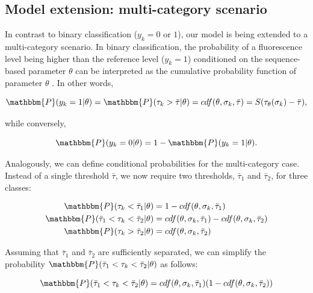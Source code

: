 \documentclass{article}
\begin{document}
\subsection{Model extension: multi-category scenario}

In contrast to binary classification ($y_k=0$ or $1$), our model is being extended to a multi-category scenario. In binary classification, the probability of a fluorescence level being higher than the reference level ($y_k=1$) conditioned on the sequence-based parameter $\theta$ can be interpreted as the cumulative probability function of parameter $\theta$ \cite{Mitra2018NatCommun}. In other words,

\begin{equation}
\mathbbm{P}(y_k=1|\theta) = \mathbbm{P}(\tau_k>\bar{\tau}|\theta) = cdf(\theta,\sigma_k,\bar{\tau})=S(\tau_\theta(\sigma_k)-\bar{\tau}),
\end{equation}

\noindent while conversely,

\begin{equation}
\mathbbm{P}(y_k=0|\theta) = 1-\mathbbm{P}(y_k=1|\theta).
\end{equation}

Analogously, we can define conditional probabilities for the multi-category case. Instead of a single threshold $\bar{\tau}$, we now require two thresholds, $\bar{\tau}_1$ and $\bar{\tau}_2$, for three classes:

\begin{equation}
\begin{aligned}
    \mathbbm{P}(\tau_k<\bar{\tau}_1|\theta) &= 1-cdf(\theta,\sigma_k,\bar{\tau}_1) \\
    \mathbbm{P}(\bar{\tau}_1<\tau_k<\bar{\tau}_2|\theta) &= cdf(\theta,\sigma_k,\bar{\tau}_1) - cdf(\theta,\sigma_k,\bar{\tau}_2)\\
    \mathbbm{P}(\tau_k>\bar{\tau}_2|\theta) &= cdf(\theta,\sigma_k,\bar{\tau}_2)
\end{aligned}
\end{equation}

Assuming that $\bar{\tau}_1$ and $\bar{\tau}_2$ are sufficiently separated, we can simplify the probability $\mathbbm{P}(\bar{\tau}_1<\tau_k<\bar{\tau}_2|\theta)$ as follows:

\begin{equation}
\mathbbm{P}(\bar{\tau}_1<\tau_k<\bar{\tau}_2|\theta) = cdf(\theta,\sigma_k,\bar{\tau}_1)(1- cdf(\theta,\sigma_k,\bar{\tau}_2))
\end{equation}
\end{document}
